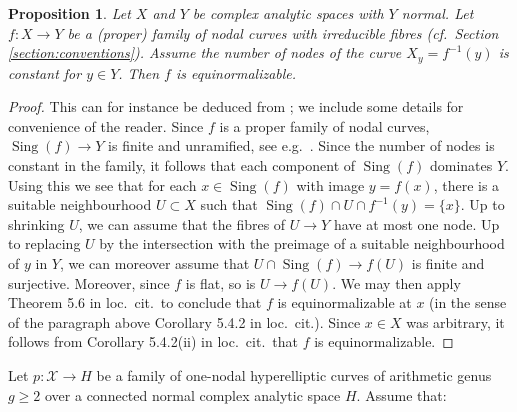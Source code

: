 \documentclass[a4paper,11pt,reqno]{amsart}
\numberwithin{equation}{section}
\theoremstyle{plain}
\newtheorem{proposition}[theorem]{Proposition}
\theoremstyle{definition}
\newcommand{\Sing}{\operatorname{Sing}}
\begin{document}
\begin{proposition} \label{prop:simultaneous-normalization}
Let $X$ and $Y$ be complex analytic spaces with $Y$ normal. 
Let $f \colon X \to Y$ be a (proper) family of nodal curves with irreducible fibres (cf.\ Section \ref{section:conventions}). Assume the number of nodes of the curve $X_y = f^{-1}(y)$ is constant for $y \in Y$. Then $f$ is equinormalizable. 
\end{proposition} 

\begin{proof}
    This can for instance be deduced from \cite[Theorem 5.6, Corollary 5.4.2, and Definition 5.1]{chiang-lipman-simultaneous}; we include some details for convenience of the reader.
    Since $f$ is a proper family of nodal curves, $\Sing(f)\to Y$ is finite and unramified, see e.g.\ \cite[\S 2.21]{dejong-alterations}.
    Since the number of nodes is constant in the family, it follows that each component of $\Sing(f)$ dominates $Y$.
    Using this we see that for each $x\in \Sing(f)$ with image $y=f(x)$, there is a suitable neighbourhood $U\subset X$ such that $\Sing(f)\cap U\cap f^{-1}(y)=\{x\}$. 
    Up to shrinking $U$, we can assume that the fibres of $U\to Y$ have at most one node.
    Up to replacing $U$ by the intersection with the preimage of a suitable neighbourhood of $y$ in $Y$, we can moreover assume that $U\cap \Sing(f)\to f(U)$ is finite and surjective.
    Moreover, since $f$ is flat, so is $U\to f(U)$.
    We may then apply Theorem 5.6 in loc.\ cit.\ to conclude that $f$
    is equinormalizable at $x$ (in the sense of the paragraph above Corollary 5.4.2 in loc.\ cit.). 
    Since $x\in X$ was arbitrary, it follows from Corollary 5.4.2(ii) in loc.\ cit.\ that $f$ is equinormalizable. 
\end{proof}
Let $p\colon\mathcal X\to H$ be a family of one-nodal hyperelliptic curves of arithmetic genus $g \geq 2$ over a connected normal complex analytic space $H$. 
Assume that:
\end{document}
